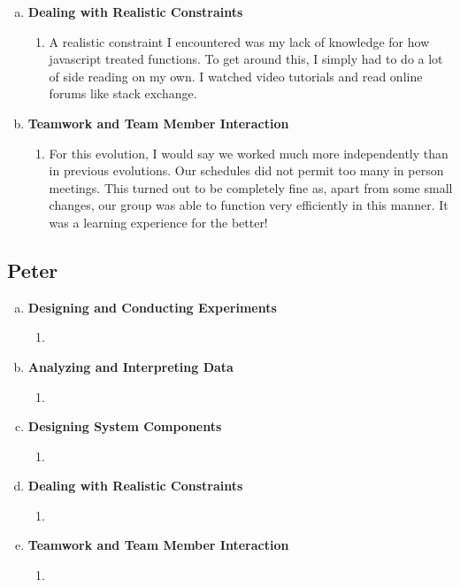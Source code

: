 \documentclass[11pt]{article}   %
\begin{document}
\begin{enumerate} [a)]
\begin{enumerate} [$\cdot$]
\end{enumerate}
\item {\bf Dealing with Realistic Constraints}
\begin{enumerate} [$\cdot$]
\item A realistic constraint I encountered was my lack of knowledge for how javascript treated functions. To get around this, I simply had to do a lot of side reading on my own. I watched video tutorials and read online forums like stack exchange. 
\end{enumerate}
\item  {\bf Teamwork and Team Member Interaction}
\begin{enumerate} [$\cdot$]
\item For this evolution, I would say we worked much more independently than in previous evolutions. Our schedules did not permit too many in person meetings. This turned out to be completely fine as, apart from some small changes, our group was able to function very efficiently in this manner. It was a learning experience for the better!
\end{enumerate}
\end{enumerate}

\subsection*{Peter}

\begin{enumerate} [a)]
\item  {\bf Designing and Conducting Experiments}
\begin{enumerate} [$\cdot$]
\item 
\end{enumerate}
\item  {\bf Analyzing and Interpreting Data}
\begin{enumerate} [$\cdot$]
\item 
\end{enumerate}
\item {\bf Designing System Components}
\begin{enumerate} [$\cdot$]
\item 
\end{enumerate}
\item {\bf Dealing with Realistic Constraints}
\begin{enumerate} [$\cdot$]
\item 
\end{enumerate}
\item  {\bf Teamwork and Team Member Interaction}
\begin{enumerate} [$\cdot$]
\item 
\end{enumerate}
\end{enumerate}
\end{document}
